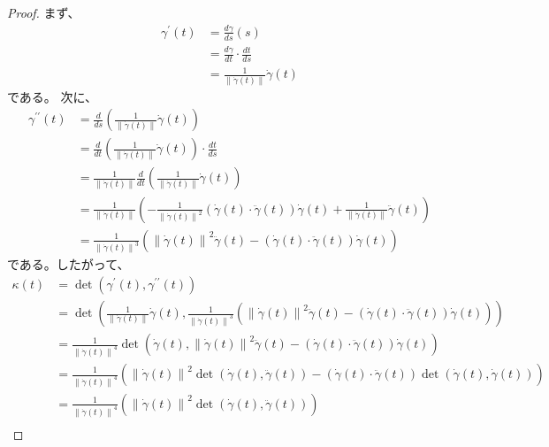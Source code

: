 \documentclass[article,paper=a4paper]{jlreq}
\begin{document}
\begin{proof}
    まず、
    \begin{align*}
        \gamma^{\prime}(t) &= \frac{d\gamma}{ds}(s) \\
        &= \frac{d\gamma}{dt}\cdot \frac{dt}{ds} \\
        &= \frac{1}{\left\|\dot{\gamma}(t)\right\|}\dot{\gamma}(t)
    \end{align*}
    である。
    次に、
    \begin{align*}
        \gamma^{\prime\prime}(t) &= \frac{d}{ds}\left(\frac{1}{\left\|\dot{\gamma}(t)\right\|}\dot{\gamma}(t)\right) \\
        &= \frac{d}{dt}\left(\frac{1}{\left\|\dot{\gamma}(t)\right\|}\dot{\gamma}(t)\right) \cdot \frac{dt}{ds} \\
        &= \frac{1}{\left\|\dot{\gamma}(t)\right\|}\frac{d}{dt}\left(\frac{1}{\left\|\dot{\gamma}(t)\right\|}\dot{\gamma}(t)\right) \\
        &= \frac{1}{\left\|\dot{\gamma}(t)\right\|}\left(-\frac{1}{\left\|\dot{\gamma}(t)\right\|^2}\left(\dot{\gamma}(t) \cdot \ddot{\gamma}(t)\right)\dot{\gamma}(t) + \frac{1}{\left\|\dot{\gamma}(t)\right\|}\ddot{\gamma}(t)\right) \\
        &= \frac{1}{\left\|\dot{\gamma}(t)\right\|^3}\left(\left\|\dot{\gamma}(t)\right\|^2 \ddot{\gamma}(t) - \left(\dot{\gamma}(t) \cdot \ddot{\gamma}(t)\right)\dot{\gamma}(t)\right)
    \end{align*}
    である。したがって、
    \begin{align*}
        \kappa(t) &= \det(\gamma^{\prime}(t), \gamma^{\prime\prime}(t)) \\
        &= \det\left(\frac{1}{\left\|\dot{\gamma}(t)\right\|}\dot{\gamma}(t), \frac{1}{\left\|\dot{\gamma}(t)\right\|^3}\left(\left\|\dot{\gamma}(t)\right\|^2 \ddot{\gamma}(t) - \left(\dot{\gamma}(t) \cdot \ddot{\gamma}(t)\right)\dot{\gamma}(t)\right)\right) \\
        &= \frac{1}{\left\|\dot{\gamma}(t)\right\|^4}\det\left(\dot{\gamma}(t), \left\|\dot{\gamma}(t)\right\|^2 \ddot{\gamma}(t) - \left(\dot{\gamma}(t) \cdot \ddot{\gamma}(t)\right)\dot{\gamma}(t)\right) \\
        &= \frac{1}{\left\|\dot{\gamma}(t)\right\|^4}\left(\left\|\dot{\gamma}(t)\right\|^2 \det(\dot{\gamma}(t), \ddot{\gamma}(t)) - \left(\dot{\gamma}(t) \cdot \ddot{\gamma}(t)\right)\det(\dot{\gamma}(t), \dot{\gamma}(t))\right) \\
        &= \frac{1}{\left\|\dot{\gamma}(t)\right\|^4}\left(\left\|\dot{\gamma}(t)\right\|^2 \det(\dot{\gamma}(t), \ddot{\gamma}(t))\right) \\

\end{align*}
\end{proof}
\end{document}
